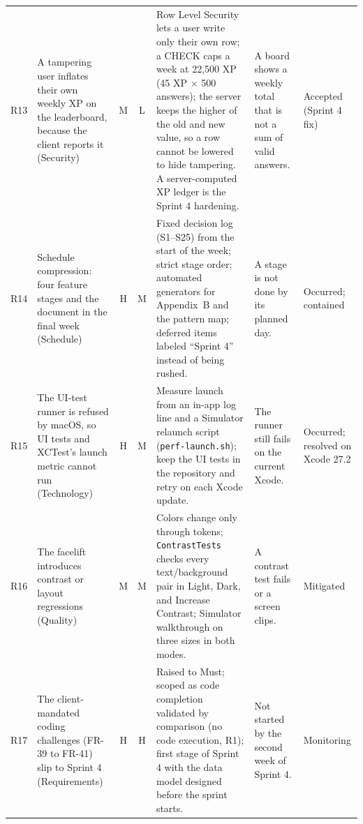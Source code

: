 \documentclass[12pt,letterpaper]{article}
\begin{document}
\begin{xltabular}{\textwidth}{@{}l L{3.0cm} c c Y L{2.9cm} L{1.7cm}@{}}
R13 & A tampering user inflates their own weekly XP on the leaderboard, because the client reports it (Security) & M & L & Row Level Security lets a user write only their own row; a CHECK caps a week at 22,500 XP (45 XP $\times$ 500 answers); the server keeps the higher of the old and new value, so a row cannot be lowered to hide tampering. A server-computed XP ledger is the Sprint 4 hardening. & A board shows a weekly total that is not a sum of valid answers. & Accepted (Sprint 4 fix) \\
R14 & Schedule compression: four feature stages and the document in the final week (Schedule) & H & M & Fixed decision log (S1--S25) from the start of the week; strict stage order; automated generators for Appendix~B and the pattern map; deferred items labeled ``Sprint 4'' instead of being rushed. & A stage is not done by its planned day. & Occurred; contained \\
R15 & The UI-test runner is refused by macOS, so UI tests and XCTest's launch metric cannot run (Technology) & H & M & Measure launch from an in-app log line and a Simulator relaunch script (\texttt{perf-launch.sh}); keep the UI tests in the repository and retry on each Xcode update. & The runner still fails on the current Xcode. & Occurred; resolved on Xcode 27.2 \\
R16 & The facelift introduces contrast or layout regressions (Quality) & M & M & Colors change only through tokens; \texttt{ContrastTests} checks every text/background pair in Light, Dark, and Increase Contrast; Simulator walkthrough on three sizes in both modes. & A contrast test fails or a screen clips. & Mitigated \\
R17 & The client-mandated coding challenges (FR-39 to FR-41) slip to Sprint 4 (Requirements) & H & H & Raised to Must; scoped as code completion validated by comparison (no code execution, R1); first stage of Sprint 4 with the data model designed before the sprint starts. & Not started by the second week of Sprint 4. & Monitoring \\
\end{xltabular}
\end{document}
